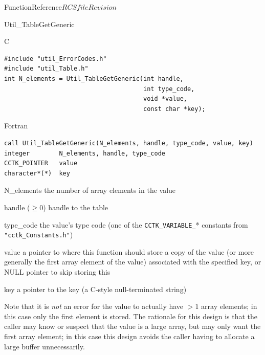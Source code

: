 \begin{cactuspart}{FunctionReference}{$RCSfile$}{$Revision$}
\begin{FunctionDescription}{Util\_TableGetGeneric}
\begin{SynopsisSection}
\begin{Synopsis}{C}
\begin{verbatim}
#include "util_ErrorCodes.h"
#include "util_Table.h"
int N_elements = Util_TableGetGeneric(int handle,
                                      int type_code,
                                      void *value,
                                      const char *key);
\end{verbatim}
\end{Synopsis}
\begin{Synopsis}{Fortran}
\begin{verbatim}
call Util_TableGetGeneric(N_elements, handle, type_code, value, key)
integer        N_elements, handle, type_code
CCTK_POINTER   value
character*(*)  key
\end{verbatim}
\end{Synopsis}
\end{SynopsisSection}

\begin{ResultSection}
\begin{Result}{N\_elements}
the number of array elements in the value
\end{Result}
\end{ResultSection}

\begin{ParameterSection}
\begin{Parameter}{handle ($\ge 0$)}
handle to the table
\end{Parameter}
\begin{Parameter}{type\_code}
the value's type code
(one of the \verb|CCTK_VARIABLE_|* constants from \verb|"cctk_Constants.h"|)
\end{Parameter}
\begin{Parameter}{value}
a pointer to where this function should store a copy of the value
(or more generally the first array element of the value) associated
with the specified key,
or NULL pointer to skip storing this
\end{Parameter}
\begin{Parameter}{key}
a pointer to the key (a C-style null-terminated string)
\end{Parameter}
\end{ParameterSection}

\begin{Discussion}
Note that it is {\em not\/} an error for the value to actually have
$> 1$ array elements; in this case only the first element is stored.
The rationale for this design is that the caller may know or suspect
that the value is a large array, but may only want the first array
element; in this case this design avoids the caller having to allocate
a large buffer unnecessarily.


\end{Discussion}
\end{FunctionDescription}
\end{cactuspart}
